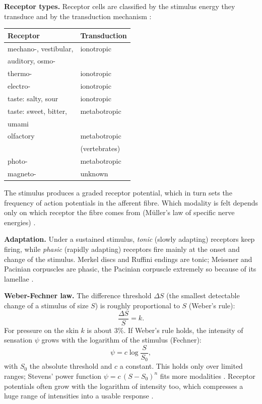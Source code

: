 \textbf{Receptor types.}
Receptor cells are classified by the
stimulus energy they transduce and by
the transduction mechanism
\cite[Table 14.1]{hill2012animal}:
\begin{center}
\begin{tabular}{ll}
Receptor & Transduction \\
\hline
mechano-, vestibular,
& ionotropic \\
\quad auditory, osmo- & \\
thermo- & ionotropic \\
electro- & ionotropic \\
taste: salty, sour & ionotropic \\
taste: sweet, bitter, & metabotropic \\
\quad umami & \\
olfactory & metabotropic \\
 & \quad (vertebrates) \\
photo- & metabotropic \\
magneto- & unknown \\
\end{tabular}
\end{center}
The stimulus produces a graded receptor
potential, which in turn sets the
frequency of action potentials in the
afferent fibre. Which modality is felt
depends only on which receptor the fibre
comes from (M\"uller's law of specific
nerve energies)
\cite[Chapter 1]{schmidt1981sensory}.

\textbf{Adaptation.}
Under a sustained stimulus, \emph{tonic}
(slowly adapting) receptors keep firing,
while \emph{phasic} (rapidly adapting)
receptors fire mainly at the onset and
change of the stimulus. Merkel discs and
Ruffini endings are tonic; Meissner and
Pacinian corpuscles are phasic, the
Pacinian corpuscle extremely so because
of its lamellae \cite[Chapter
14]{hill2012animal}.

\textbf{Weber-Fechner law.}
The difference threshold $\Delta S$ (the
smallest detectable change of a stimulus
of size $S$) is roughly proportional to
$S$ (Weber's rule):
$$
\frac{\Delta S}{S} = k.
$$
For pressure on the skin $k$ is about
$3\%$. If Weber's rule holds, the
intensity of sensation $\psi$ grows with
the logarithm of the stimulus (Fechner):
$$
\psi = c \log\frac{S}{S_0},
$$
with $S_0$ the absolute threshold and $c$
a constant. This holds only over limited
ranges; Stevens' power function
$\psi = c\,(S - S_0)^n$ fits more
modalities \cite[Chapter
1]{schmidt1981sensory}. Receptor
potentials often grow with the logarithm
of intensity too, which compresses a huge
range of intensities into a usable
response \cite[Chapter
7]{randall1997eckert}.

